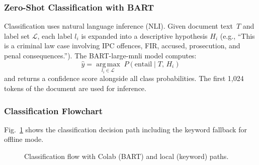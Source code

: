 \documentclass[conference]{IEEEtran}
\begin{document}
\subsubsection{Zero-Shot Classification with BART}

Classification uses natural language inference (NLI). Given document text~$T$
and label set $\mathcal{L}$, each label $l_i$ is expanded into a descriptive
hypothesis $H_i$ (e.g., ``This is a criminal law case involving IPC offences,
FIR, accused, prosecution, and penal consequences.''). The BART-large-mnli
model computes:
\begin{equation}
  \hat{y} = \operatorname*{arg\,max}_{l_i \in \mathcal{L}}\;
            P\!\left(\text{entail} \mid T,\, H_i\right)
\end{equation}
and returns a confidence score alongside all class probabilities. The first
1{,}024 tokens of the document are used for inference.

\subsubsection{Classification Flowchart}

Fig.~\ref{fig:classify_flow} shows the classification decision path including
the keyword fallback for offline mode.

\begin{figure}[ht]
\centering
{}
\caption{Classification flow with Colab (BART) and local (keyword) paths.}
\label{fig:classify_flow}
\end{figure}
\end{document}
